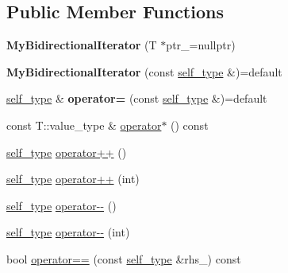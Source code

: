 \subsection*{Public Member Functions}
\begin{DoxyCompactItemize}
\item 
{\bfseries My\+Bidirectional\+Iterator} (T $\ast$ptr\+\_\+=nullptr)\hypertarget{classls_1_1MyBidirectionalIterator_aa86faf12d6094258ade30ef662d00fa0}{}\label{classls_1_1MyBidirectionalIterator_aa86faf12d6094258ade30ef662d00fa0}

\item 
{\bfseries My\+Bidirectional\+Iterator} (const \hyperlink{classls_1_1MyBidirectionalIterator}{self\+\_\+type} \&)=default\hypertarget{classls_1_1MyBidirectionalIterator_ad49837e80546f9668e1fd57829542759}{}\label{classls_1_1MyBidirectionalIterator_ad49837e80546f9668e1fd57829542759}

\item 
\hyperlink{classls_1_1MyBidirectionalIterator}{self\+\_\+type} \& {\bfseries operator=} (const \hyperlink{classls_1_1MyBidirectionalIterator}{self\+\_\+type} \&)=default\hypertarget{classls_1_1MyBidirectionalIterator_a32070468a19eab37669cb2151d78bb86}{}\label{classls_1_1MyBidirectionalIterator_a32070468a19eab37669cb2151d78bb86}

\item 
const T\+::value\+\_\+type \& \hyperlink{classls_1_1MyBidirectionalIterator_a69381f58aabbfb7d497da0c6db62a521}{operator$\ast$} () const 
\item 
\hyperlink{classls_1_1MyBidirectionalIterator}{self\+\_\+type} \hyperlink{classls_1_1MyBidirectionalIterator_aad3dac93bddbfa64971868f5fe4c4977}{operator++} ()
\item 
\hyperlink{classls_1_1MyBidirectionalIterator}{self\+\_\+type} \hyperlink{classls_1_1MyBidirectionalIterator_a8696b0ae974230040ef6dbec354caa34}{operator++} (int)
\item 
\hyperlink{classls_1_1MyBidirectionalIterator}{self\+\_\+type} \hyperlink{classls_1_1MyBidirectionalIterator_a7c3b5a5f8857ffb8741688591f4d5c29}{operator-\/-\/} ()
\item 
\hyperlink{classls_1_1MyBidirectionalIterator}{self\+\_\+type} \hyperlink{classls_1_1MyBidirectionalIterator_ad3dc0186d4c464a557ae9ccf5ca377c6}{operator-\/-\/} (int)
\item 
bool \hyperlink{classls_1_1MyBidirectionalIterator_a792c43d0fac351ee21bf6b4ab6f27594}{operator==} (const \hyperlink{classls_1_1MyBidirectionalIterator}{self\+\_\+type} \&rhs\+\_\+) const \hypertarget{classls_1_1MyBidirectionalIterator_a792c43d0fac351ee21bf6b4ab6f27594}{}\label{classls_1_1MyBidirectionalIterator_a792c43d0fac351ee21bf6b4ab6f27594}


\end{DoxyCompactItemize}
